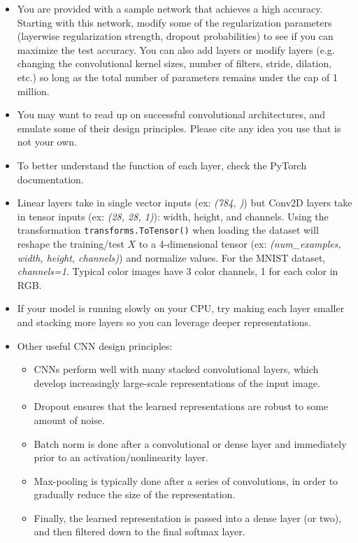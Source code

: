 \begin{itemize}
	\item You are provided with a sample network that achieves a high accuracy. Starting with this network, modify some of the regularization parameters (layerwise regularization strength, dropout probabilities) to see if you can maximize the test accuracy. You can also add layers or modify layers (e.g.
	changing the convolutional kernel sizes, number of filters, stride, dilation, etc.) so long as the total number of parameters remains under the cap of 1 million.
  \item You may want to read up on successful convolutional architectures, and emulate some of their design principles. Please cite any idea you use that is not your own.
  \item To better understand the function of each layer, check the PyTorch documentation.
  \item Linear layers take in single vector inputs (ex: \emph{(784, )}) but Conv2D layers
	take in tensor inputs (ex: \emph{(28, 28, 1)}): width, height, and channels. Using the transformation \verb$transforms.ToTensor()$ when loading the dataset will reshape the training/test $X$ to a 4-dimensional tensor (ex: \emph{(num_examples, width, height, channels)}) and normalize values. For the MNIST dataset, \emph{channels=1}. Typical color images have 3 color channels, 1 for each color in RGB.
	\item If your model is running slowly on your CPU, try making each layer smaller
	and stacking more layers so you can leverage deeper representations.
	\item Other useful CNN design principles:
  \begin{itemize}
    \item CNNs perform well with many stacked convolutional layers, which develop increasingly large-scale representations of the input image.
    \item Dropout ensures that the learned representations are robust to some amount of noise.
    \item Batch norm is done after a convolutional or dense layer and immediately prior to an activation/nonlinearity layer.
    \item Max-pooling is typically done after a series of convolutions, in order to gradually reduce the size of the representation.
    \item Finally, the learned representation is passed into a dense layer (or two), and then filtered down to the final softmax layer.
  \end{itemize}
\end{itemize}


\begin{subsolution}

\end{subsolution}


